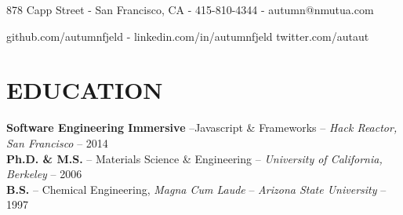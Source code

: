 \documentclass[11pt]{res} %
\newcommand{\myrule} [3] []{
    \begin{center}
        \begin{tikzpicture}
            \draw[#2-#3, thick, #1] (0,0) to (.9\linewidth,0);
        \end{tikzpicture}
    \end{center}
}
\newcommand\details[1]{\vspace{-20pt}\color{AutGreen}\begin{center}#1\end{center}\vspace{-16pt}}
\begin{document}
 
\thispagestyle{empty}
 \name{ {\sc {\Large \color{AutGreen} {\sc Autumn Fjeld}}} \\[8pt]} %


\begin{resume}
\details{878 Capp Street - San Francisco, CA - 415-810-4344 - autumn@nmutua.com }
\details{  github.com/autumnfjeld - linkedin.com/in/autumnfjeld twitter.com/autaut}



\vspace{-20pt}
\color{AutGreen}{  \myrule{o}{o} }
\color{DarkGray}
\vspace{-15pt}  
\section{EDUCATION} 
\vspace{4pt}
 {\bf  Software Engineering Immersive} --Javascript \& Frameworks -- {\it Hack Reactor, San Francisco} -- 2014 \\
 {\bf Ph.D. \& M.S.} -- Materials Science \& Engineering -- {\it University of California, Berkeley}  -- 2006 \\
 {\bf B.S.} -- Chemical Engineering, {\it Magna Cum Laude} -- {\it Arizona State University } --  1997 \\


\end{resume}
\end{document}

